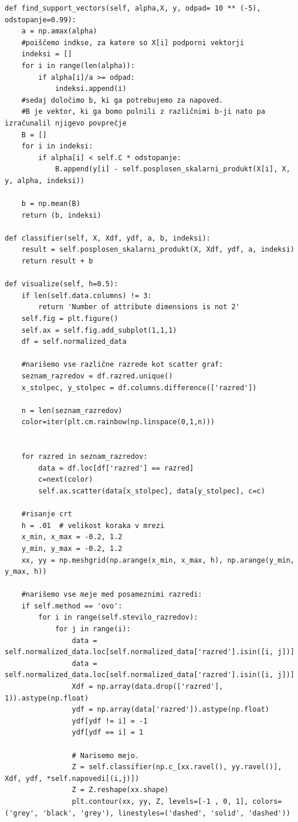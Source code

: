 \documentclass[mat1]{fmfdelo}
\begin{document}
\begin{scriptsize}
\begin{verbatim}
def find_support_vectors(self, alpha,X, y, odpad= 10 ** (-5), odstopanje=0.99):
    a = np.amax(alpha)
    #poiščemo indkse, za katere so X[i] podporni vektorji
    indeksi = []
    for i in range(len(alpha)):
        if alpha[i]/a >= odpad:
            indeksi.append(i)
    #sedaj določimo b, ki ga potrebujemo za napoved.
    #B je vektor, ki ga bomo polnili z različnimi b-ji nato pa izračunalil njigevo povprečje
    B = []
    for i in indeksi:
        if alpha[i] < self.C * odstopanje:
            B.append(y[i] - self.posplosen_skalarni_produkt(X[i], X, y, alpha, indeksi))
    
    b = np.mean(B)
    return (b, indeksi)
     
def classifier(self, X, Xdf, ydf, a, b, indeksi):
    result = self.posplosen_skalarni_produkt(X, Xdf, ydf, a, indeksi)
    return result + b

def visualize(self, h=0.5):
    if len(self.data.columns) != 3:
        return 'Number of attribute dimensions is not 2'
    self.fig = plt.figure()
    self.ax = self.fig.add_subplot(1,1,1)
    df = self.normalized_data
    
    #narišemo vse različne razrede kot scatter graf:
    seznam_razredov = df.razred.unique()
    x_stolpec, y_stolpec = df.columns.difference(['razred'])

    n = len(seznam_razredov)       
    color=iter(plt.cm.rainbow(np.linspace(0,1,n)))
    
    
    for razred in seznam_razredov:
        data = df.loc[df['razred'] == razred]
        c=next(color)
        self.ax.scatter(data[x_stolpec], data[y_stolpec], c=c)
    
    #risanje crt
    h = .01  # velikost koraka v mrezi
    x_min, x_max = -0.2, 1.2
    y_min, y_max = -0.2, 1.2
    xx, yy = np.meshgrid(np.arange(x_min, x_max, h), np.arange(y_min, y_max, h))
    
    #narišemo vse meje med posameznimi razredi:
    if self.method == 'ovo':
        for i in range(self.stevilo_razredov):
            for j in range(i):
                data = self.normalized_data.loc[self.normalized_data['razred'].isin([i, j])]
                data = self.normalized_data.loc[self.normalized_data['razred'].isin([i, j])]
                Xdf = np.array(data.drop(['razred'], 1)).astype(np.float)
                ydf = np.array(data['razred']).astype(np.float)
                ydf[ydf != i] = -1
                ydf[ydf == i] = 1

                # Narisemo mejo. 
                Z = self.classifier(np.c_[xx.ravel(), yy.ravel()], Xdf, ydf, *self.napovedi[(i,j)])
                Z = Z.reshape(xx.shape)
                plt.contour(xx, yy, Z, levels=[-1 , 0, 1], colors=('grey', 'black', 'grey'), linestyles=('dashed', 'solid', 'dashed'))
    

\end{verbatim}
\end{scriptsize}
\end{document}
